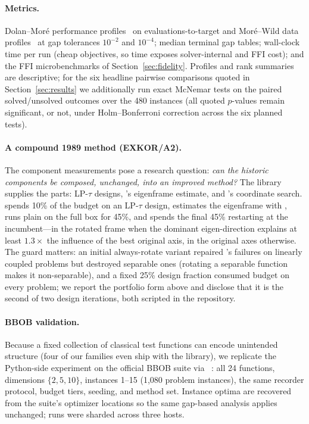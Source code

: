 \paragraph{Metrics.} Dolan--Mor\'e performance
profiles~\cite{dolan2002benchmarking} on evaluations-to-target and
Mor\'e--Wild data profiles~\cite{more2009benchmarking} at gap tolerances
$10^{-2}$ and $10^{-4}$; median terminal gap tables; wall-clock time per
run (cheap objectives, so time exposes solver-internal and FFI cost);
and the FFI microbenchmarks of Section~\ref{sec:fidelity}. Profiles and
rank summaries are descriptive; for the six headline pairwise
comparisons quoted in Section~\ref{sec:results} we additionally run
exact McNemar tests on the paired solved/unsolved outcomes over the 480
instances (all quoted $p$-values remain significant, or not, under
Holm--Bonferroni correction across the six planned tests).

\paragraph{A compound 1989 method (EXKOR/A2).} The component
measurements pose a research question: \emph{can the historic
components be composed, unchanged, into an improved method?} The
library supplies the parts: LP-$\tau$ designs, 's
eigenframe estimate, and 's coordinate search.
 spends 10\% of the budget on an LP-$\tau$ design,
estimates the eigenframe with , runs plain 
on the full box for 45\%, and spends the final 45\% restarting
 at the incumbent---in the rotated frame when the dominant
eigen-direction explains at least $1.3\times$ the influence of the best
original axis, in the original axes otherwise. The guard matters: an
initial always-rotate variant repaired 's failures on
linearly coupled problems but destroyed separable ones (rotating a
separable function makes it non-separable), and a fixed 25\% design
fraction consumed budget on every problem; we report the portfolio form above and
disclose that it is the second of two design iterations, both scripted
in the repository.

\paragraph{BBOB validation.} Because a fixed collection of classical
test functions can encode unintended structure (four of our families
even ship with the library), we replicate the Python-side experiment on
the official BBOB suite via ~\cite{hansen2021coco}: all 24
functions, dimensions $\{2,5,10\}$, instances 1--15 (1{,}080 problem
instances), the same recorder protocol, budget tiers, seeding, and
method set. Instance optima are recovered from the suite's optimizer
locations so the same gap-based analysis applies unchanged; runs were
sharded across three hosts.

